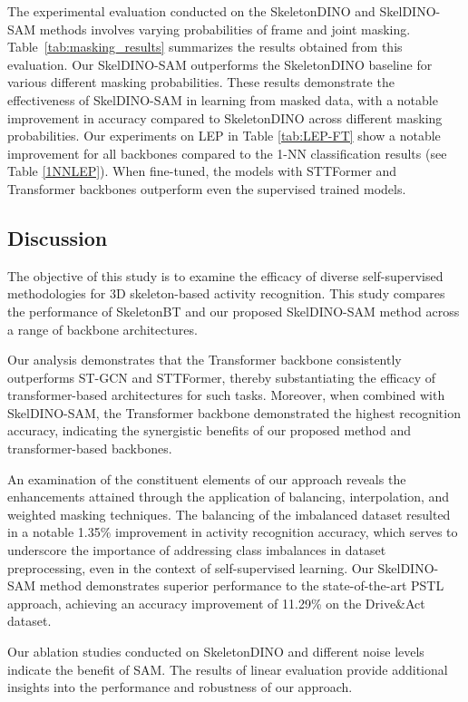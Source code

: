 The experimental evaluation conducted on the SkeletonDINO and SkelDINO-SAM methods involves varying probabilities of frame and joint masking. Table~\ref{tab:masking_results} summarizes the results obtained from this evaluation. Our SkelDINO-SAM outperforms the SkeletonDINO baseline for various different masking probabilities. These results demonstrate the effectiveness of SkelDINO-SAM in learning from masked data, with a notable improvement in accuracy compared to SkeletonDINO across different masking probabilities.
Our experiments on LEP in Table \ref{tab:LEP-FT} show a notable improvement for all backbones compared to the 1-NN classification results (see Table \ref{1NNLEP}). When fine-tuned, the models with STTFormer and Transformer backbones outperform even the supervised trained models. 

\subsection{Discussion}
The objective of this study is to examine the efficacy of diverse self-supervised methodologies for 3D skeleton-based activity recognition. This study compares the performance of SkeletonBT and our proposed SkelDINO-SAM method across a range of backbone architectures. 

Our analysis demonstrates that the Transformer backbone consistently outperforms ST-GCN and STTFormer, thereby substantiating the efficacy of transformer-based architectures for such tasks. Moreover, when combined with SkelDINO-SAM, the Transformer backbone demonstrated the highest recognition accuracy, indicating the synergistic benefits of our proposed method and transformer-based backbones.

An examination of the constituent elements of our approach reveals the enhancements attained through the application of balancing, interpolation, and weighted masking techniques. The balancing of the imbalanced dataset resulted in a notable 1.35\% improvement in activity recognition accuracy, which serves to underscore the importance of addressing class imbalances in dataset preprocessing, even in the context of self-supervised learning. Our SkelDINO-SAM method demonstrates superior performance to the state-of-the-art PSTL approach, achieving an accuracy improvement of 11.29\% on the Drive\&Act dataset.

Our ablation studies conducted on SkeletonDINO and different noise levels indicate the benefit of SAM. The results of linear evaluation provide additional insights into the performance and robustness of our approach.
